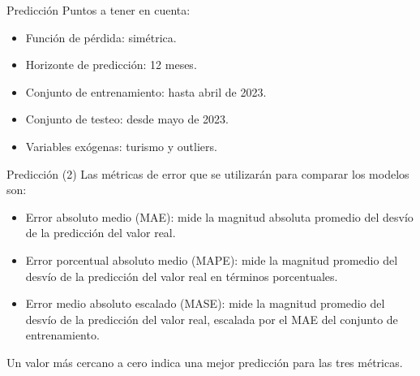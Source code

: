 \documentclass[
  ignorenonframetext,
]{beamer}
\begin{document}
\begin{frame}{Predicción}
\protect\hypertarget{predicciuxf3n}{}
Puntos a tener en cuenta:

\begin{itemize}
\item
  Función de pérdida: simétrica.
\item
  Horizonte de predicción: 12 meses.
\item
  Conjunto de entrenamiento: hasta abril de 2023.
\item
  Conjunto de testeo: desde mayo de 2023.
\item
  Variables exógenas: turismo y outliers.
\end{itemize}
\end{frame}

\begin{frame}{Predicción (2)}
\protect\hypertarget{predicciuxf3n-2}{}
Las métricas de error que se utilizarán para comparar los modelos son:

\begin{itemize}
\item
  Error absoluto medio (MAE): mide la magnitud absoluta promedio del
  desvío de la predicción del valor real.
\item
  Error porcentual absoluto medio (MAPE): mide la magnitud promedio del
  desvío de la predicción del valor real en términos porcentuales.
\item
  Error medio absoluto escalado (MASE): mide la magnitud promedio del
  desvío de la predicción del valor real, escalada por el MAE del
  conjunto de entrenamiento.
\end{itemize}

Un valor más cercano a cero indica una mejor predicción para las tres
métricas.
\end{frame}
\end{document}
